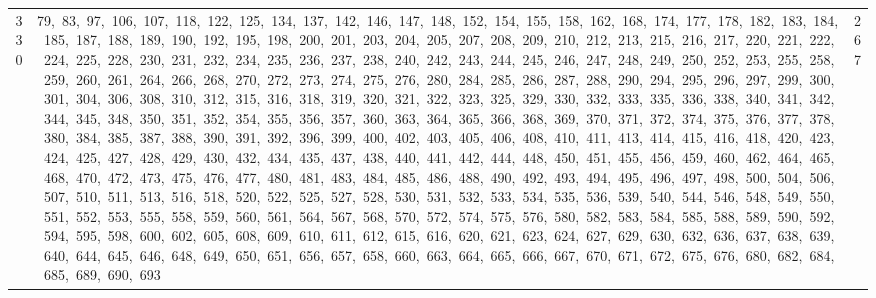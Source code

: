 \begin{longtable}{c|p{}|r}
330 & 79,\ 83,\ 97,\ 106,\ 107,\ 118,\ 122,\ 125,\ 134,\ 137,\ 142,\ 146,\ 147,\ 148,\ 152,\ 154,\ 155,\ 158,\ 162,\ 168,\ 174,\ 177,\ 178,\ 182,\ 183,\ 184,\ 185,\ 187,\ 188,\ 189,\ 190,\ 192,\ 195,\ 198,\ 200,\ 201,\ 203,\ 204,\ 205,\ 207,\ 208,\ 209,\ 210,\ 212,\ 213,\ 215,\ 216,\ 217,\ 220,\ 221,\ 222,\ 224,\ 225,\ 228,\ 230,\ 231,\ 232,\ 234,\ 235,\ 236,\ 237,\ 238,\ 240,\ 242,\ 243,\ 244,\ 245,\ 246,\ 247,\ 248,\ 249,\ 250,\ 252,\ 253,\ 255,\ 258,\ 259,\ 260,\ 261,\ 264,\ 266,\ 268,\ 270,\ 272,\ 273,\ 274,\ 275,\ 276,\ 280,\ 284,\ 285,\ 286,\ 287,\ 288,\ 290,\ 294,\ 295,\ 296,\ 297,\ 299,\ 300,\ 301,\ 304,\ 306,\ 308,\ 310,\ 312,\ 315,\ 316,\ 318,\ 319,\ 320,\ 321,\ 322,\ 323,\ 325,\ 329,\ 330,\ 332,\ 333,\ 335,\ 336,\ 338,\ 340,\ 341,\ 342,\ 344,\ 345,\ 348,\ 350,\ 351,\ 352,\ 354,\ 355,\ 356,\ 357,\ 360,\ 363,\ 364,\ 365,\ 366,\ 368,\ 369,\ 370,\ 371,\ 372,\ 374,\ 375,\ 376,\ 377,\ 378,\ 380,\ 384,\ 385,\ 387,\ 388,\ 390,\ 391,\ 392,\ 396,\ 399,\ 400,\ 402,\ 403,\ 405,\ 406,\ 408,\ 410,\ 411,\ 413,\ 414,\ 415,\ 416,\ 418,\ 420,\ 423,\ 424,\ 425,\ 427,\ 428,\ 429,\ 430,\ 432,\ 434,\ 435,\ 437,\ 438,\ 440,\ 441,\ 442,\ 444,\ 448,\ 450,\ 451,\ 455,\ 456,\ 459,\ 460,\ 462,\ 464,\ 465,\ 468,\ 470,\ 472,\ 473,\ 475,\ 476,\ 477,\ 480,\ 481,\ 483,\ 484,\ 485,\ 486,\ 488,\ 490,\ 492,\ 493,\ 494,\ 495,\ 496,\ 497,\ 498,\ 500,\ 504,\ 506,\ 507,\ 510,\ 511,\ 513,\ 516,\ 518,\ 520,\ 522,\ 525,\ 527,\ 528,\ 530,\ 531,\ 532,\ 533,\ 534,\ 535,\ 536,\ 539,\ 540,\ 544,\ 546,\ 548,\ 549,\ 550,\ 551,\ 552,\ 553,\ 555,\ 558,\ 559,\ 560,\ 561,\ 564,\ 567,\ 568,\ 570,\ 572,\ 574,\ 575,\ 576,\ 580,\ 582,\ 583,\ 584,\ 585,\ 588,\ 589,\ 590,\ 592,\ 594,\ 595,\ 598,\ 600,\ 602,\ 605,\ 608,\ 609,\ 610,\ 611,\ 612,\ 615,\ 616,\ 620,\ 621,\ 623,\ 624,\ 627,\ 629,\ 630,\ 632,\ 636,\ 637,\ 638,\ 639,\ 640,\ 644,\ 645,\ 646,\ 648,\ 649,\ 650,\ 651,\ 656,\ 657,\ 658,\ 660,\ 663,\ 664,\ 665,\ 666,\ 667,\ 670,\ 671,\ 672,\ 675,\ 676,\ 680,\ 682,\ 684,\ 685,\ 689,\ 690,\ 693 & 267 \\

\end{longtable}
